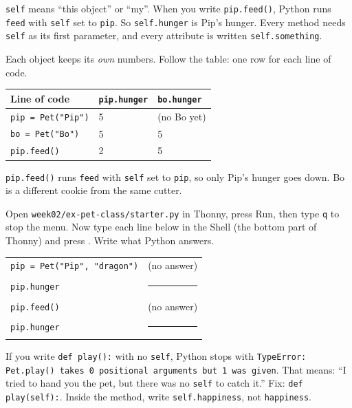 \begin{tip}
\texttt{self} means \enquote{this object} or \enquote{my}. When you write \texttt{pip.feed()}, Python runs \texttt{feed} with \texttt{self} set to \texttt{pip}. So \texttt{self.hunger} is Pip's hunger. Every method needs \texttt{self} as its first parameter, and every attribute is written \texttt{self.something}.
\end{tip}

\begin{workedexample}
Each object keeps its \emph{own} numbers. Follow the table: one row for each line of code.
\begin{center}
\renewcommand{\arraystretch}{1.25}
\begin{tabular}{@{}lll@{}}
\toprule
\textbf{Line of code} & \textbf{\texttt{pip.hunger}} & \textbf{\texttt{bo.hunger}} \\ \midrule
\texttt{pip = Pet("Pip")} & 5 & (no Bo yet) \\
\texttt{bo = Pet("Bo")} & 5 & 5 \\
\texttt{pip.feed()} & 2 & 5 \\
\bottomrule
\end{tabular}
\end{center}
\texttt{pip.feed()} runs \texttt{feed} with \texttt{self} set to \texttt{pip}, so only Pip's hunger goes down. Bo is a different cookie from the same cutter.
\end{workedexample}

\begin{tip}
Open \texttt{week02/ex-pet-class/starter.py} in Thonny, press Run, then type \texttt{q} to stop the menu. Now type each line below in the Shell (the bottom part of Thonny) and press . Write what Python answers.
\begin{center}
\renewcommand{\arraystretch}{1.3}
\begin{tabular}{@{}ll@{}}
\texttt{pip = Pet("Pip", "dragon")} & (no answer) \\
\texttt{pip.hunger} & \rule{2cm}{0.4pt} \\
\texttt{pip.feed()} & (no answer) \\
\texttt{pip.hunger} & \rule{2cm}{0.4pt} \\
\end{tabular}
\end{center}
\end{tip}

\begin{tip}
If you write \texttt{def play():} with no \texttt{self}, Python stops with
\texttt{TypeError: Pet.play() takes 0 positional arguments but 1 was given}.
That means: \enquote{I tried to hand you the pet, but there was no \texttt{self} to catch it.}
Fix: \texttt{def play(self):}. Inside the method, write \texttt{self.happiness}, not \texttt{happiness}.
\end{tip}

